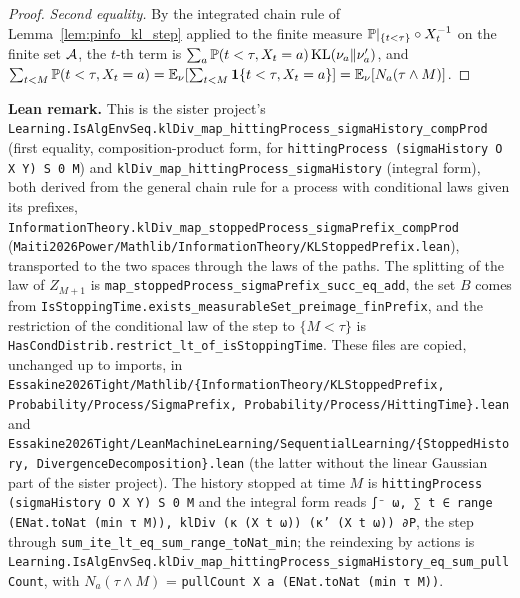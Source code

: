 \begin{proof}
\emph{Second equality.} By the integrated chain rule of Lemma~\ref{lem:pinfo_kl_step} applied
to the finite measure $\mathbb{P}|_{\{t<\tau\}}\circ X_t^{-1}$ on the finite set $\mathcal{A}$, the $t$-th
term is $\sum_a \mathbb{P}(t < \tau, X_t = a)\,\mathrm{KL}(\nu_a\|\nu'_a)$, and
$\sum_{t<M}\mathbb{P}(t<\tau, X_t = a) = \mathbb{E}_\nu[\sum_{t<M}\mathbf{1}\{t<\tau, X_t = a\}] = \mathbb{E}_\nu[N_a(\tau\wedge M)]$.
\end{proof}

\textbf{Lean remark.} This is the sister project's
\texttt{Learning.IsAlgEnvSeq.klDiv\_map\_hittingProcess\_sigmaHistory\_compProd} (first
equality, composition-product form, for \texttt{hittingProcess (sigmaHistory O X Y) S 0 M})
and \texttt{klDiv\_map\_hittingProcess\_sigmaHistory} (integral form), both derived from the
general chain rule for a process with conditional laws given its prefixes,
\texttt{InformationTheory.klDiv\_map\_stoppedProcess\_sigmaPrefix\_compProd}
(\texttt{Maiti2026Power/Mathlib/InformationTheory/KLStoppedPrefix.lean}), transported to the
two spaces through the laws of the paths. The splitting of the law of $Z_{M+1}$ is
\texttt{map\_stoppedProcess\_sigmaPrefix\_succ\_eq\_add}, the set $B$ comes from
\texttt{IsStoppingTime.exists\_measurableSet\_preimage\_finPrefix}, and the restriction of the
conditional law of the step to $\{M < \tau\}$ is \texttt{HasCondDistrib.restrict\_lt\_of\_isStoppingTime}.
These files are copied, unchanged up to imports, in
\texttt{Essakine2026Tight/Mathlib/\{InformationTheory/KLStoppedPrefix,
Probability/Process/SigmaPrefix, Probability/Process/HittingTime\}.lean} and
\texttt{Essakine2026Tight/LeanMachineLearning/SequentialLearning/\{StoppedHistory,
DivergenceDecomposition\}.lean} (the latter without the linear Gaussian part of the sister
project). The history stopped at time $M$ is \texttt{hittingProcess (sigmaHistory O X Y) S 0 M}
and the integral form reads
\texttt{∫⁻ ω, ∑ t ∈ range (ENat.toNat (min τ M)), klDiv (κ (X t ω)) (κ' (X t ω)) ∂P}, the step
through \texttt{sum\_ite\_lt\_eq\_sum\_range\_toNat\_min}; the reindexing by actions is
\texttt{Learning.IsAlgEnvSeq.klDiv\_map\_hittingProcess\_sigmaHistory\_eq\_sum\_pullCount}, with
$N_a(\tau\wedge M)$ = \texttt{pullCount X a (ENat.toNat (min τ M))}.


